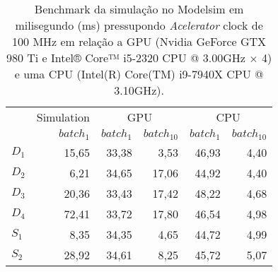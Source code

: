 \begin{table}[ht!]
\centering
\caption{Benchmark da simulação no Modelsim em milisegundo (ms) pressupondo \textit{Acelerator} clock de 100 MHz em relação a GPU (Nvidia GeForce GTX 980 Ti e Intel® Core™ i5-2320 CPU @ 3.00GHz × 4) e uma CPU (Intel(R) Core(TM) i9-7940X CPU @ 3.10GHz).}
\label{tab:5-dnn-benchmark}
\begin{tabular}{lrrrrr}
\toprule
 & Simulation & \multicolumn{2}{c}{GPU} & \multicolumn{2}{c}{CPU} \\
\cmidrule(lr){3-4} \cmidrule(l){5-6}
 & $batch_{1}$ & $batch_{1}$ & $batch_{10}$ & $batch_{1}$ & $batch_{10}$ \\
\midrule
$D_1$ & 15,65 & 33,38 & 3,53 & 46,93 & 4,40 \\
$D_2$ & 6,21 & 34,65 & 17,06 & 44,92 & 4,40 \\
$D_3$ & 20,36 & 33,43 & 17,42 & 48,22 & 4,68 \\
$D_4$ & 72,41 & 33,72 & 17,80 & 46,54 & 4,98 \\
$S_1$ & 8,35 & 34,35 & 4,65 & 44,72 & 4,99 \\
$S_2$ & 28,92 & 34,61 & 8,25 & 45,72 & 5,07 \\
\bottomrule
\end{tabular}
\end{table}